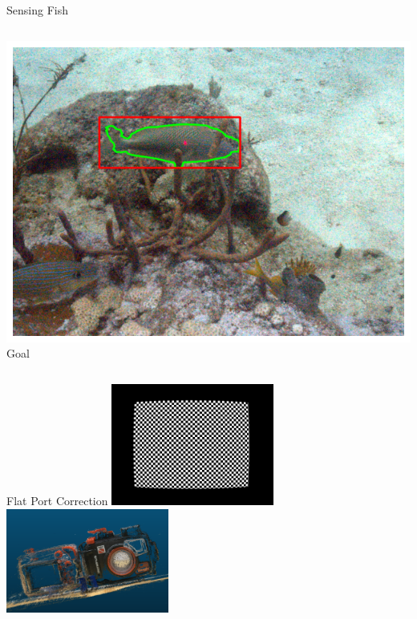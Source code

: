 \begin{frame}{Sensing Fish}
\begin{columns}
\begin{column}{0.33\textwidth}
            \includegraphics[width=\linewidth,keepaspectratio]{images/ideal.png}
            {\small Goal}
        \end{column}
    \end{columns}
\end{frame}

\begin{frame}{Flat Port Correction}
    \centering
    \includegraphics[width=0.4\textwidth,keepaspectratio]{images/remapped.jpg}
    \includegraphics[width=0.4\textwidth,keepaspectratio]{images/point_cloud_camera_enclosure.png}
\end{frame}

